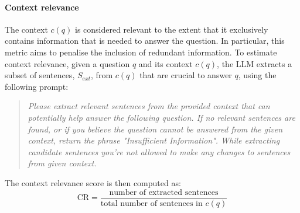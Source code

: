 \documentclass[11pt]{article}
\newcommand{\nb}[1]{\textcolor{red}{$\blacktriangleright$}\footnote{\textcolor{blue}{#1}}}
\begin{document}
\paragraph{Context relevance}
The context  $c(q)$ is considered relevant to the extent that it exclusively contains information that is needed to answer the question. In particular, this metric aims to penalise the inclusion of redundant information. To estimate context relevance,
given a question \( q \) and its context \( c(q) \), the LLM extracts a subset of sentences, \( S_{ext} \), from \( c(q) \) that are crucial to answer \( q \), using the following prompt:
\begin{quote}
\textit{Please extract relevant sentences from the provided context that can potentially help answer the following question. If no relevant sentences are found, or if you believe the question cannot be answered from the given context, return the phrase "Insufficient Information".  While extracting candidate sentences you're not allowed to make any changes to sentences from given context.}
\end{quote}
The context relevance score is then computed as:
\begin{equation}
\text{CR} = \frac{\text{number of extracted sentences}}{\text{total number of sentences in } c(q)}
\end{equation}




\end{document}
